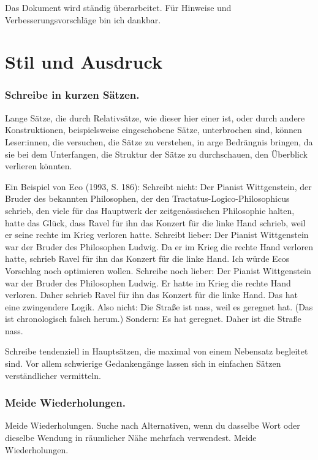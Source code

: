 \documentclass{../cssheet}
\begin{document}
Das Dokument wird ständig überarbeitet. Für Hinweise und Verbesserungsvorschläge bin ich dankbar. 

\pagestyle{docstyle}


\section{Stil und Ausdruck}

\subsubsection*{Schreibe in kurzen Sätzen.}

Lange Sätze, die durch Relativsätze, wie dieser hier einer ist, oder
durch andere Konstruktionen, beispielsweise eingeschobene Sätze,
unterbrochen sind, können Leser:innen, die versuchen, die Sätze zu
verstehen, in arge Bedrängnis bringen, da sie bei dem Unterfangen, die
Struktur der Sätze zu durchschauen, den Überblick verlieren könnten.

Ein Beispiel von Eco (1993, S. 186): \glqq{}Schreibt nicht: Der Pianist
Wittgenstein, der Bruder des bekannten Philosophen, der den
Tractatus-Logico-Philosophicus schrieb, den viele für das Hauptwerk der
zeitgenössischen Philosophie halten, hatte das Glück, dass Ravel für ihn
das Konzert für die linke Hand schrieb, weil er seine rechte im Krieg
verloren hatte. Schreibt lieber: Der Pianist Wittgenstein war der Bruder
des Philosophen Ludwig. Da er im Krieg die rechte Hand verloren hatte,
schrieb Ravel für ihn das Konzert für die linke Hand.\grqq{} Ich würde Ecos
Vorschlag noch optimieren wollen. Schreibe noch lieber: \glqq{}Der Pianist
Wittgenstein war der Bruder des Philosophen Ludwig. Er hatte im Krieg
die rechte Hand verloren. Daher schrieb Ravel für ihn das Konzert für
die linke Hand.\grqq{} Das hat eine zwingendere Logik. Also nicht: \glqq{}Die Straße
ist nass, weil es geregnet hat.\grqq{} (Das ist chronologisch falsch herum.)
Sondern: \glqq{}Es hat geregnet. Daher ist die Straße nass.\grqq{}

Schreibe tendenziell in Hauptsätzen, die maximal von einem Nebensatz
begleitet sind. Vor allem schwierige Gedankengänge lassen sich in
einfachen Sätzen verständlicher vermitteln.

\subsubsection*{Meide Wiederholungen.}

Meide Wiederholungen. Suche nach Alternativen, wenn du dasselbe Wort
oder dieselbe Wendung in räumlicher Nähe mehrfach verwendest. Meide
Wiederholungen.
\end{document}

